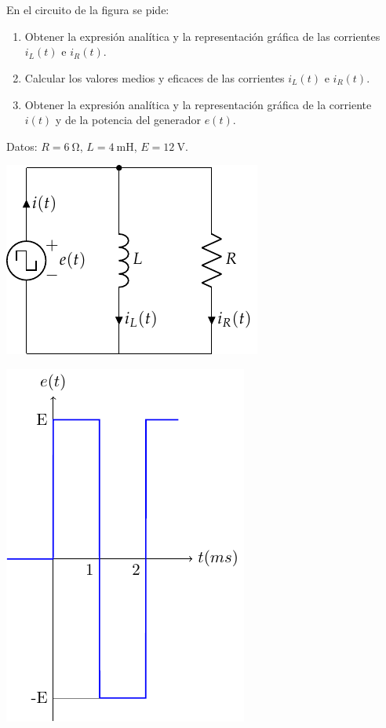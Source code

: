 \documentclass[10pt]{article}
\begin{document}
\clearpage

\section{}


En el circuito de la figura se pide:

\begin{enumerate}
\item Obtener la expresión analítica y la representación gráfica de las corrientes $i_L(t)$ e $i_R(t)$.
\item Calcular los valores medios y eficaces de las corrientes $i_L(t)$ e $i_R(t)$.
\item Obtener la expresión analítica y la representación gráfica de la corriente $i(t)$ y de la potencia del generador $e(t)$.
\end{enumerate}

Datos: $R = \SI{6}{\ohm}$, $L = \SI{4}{\milli\henry}$, $E = \SI{12}{\volt}$.

\begin{minipage}[c]{0.5\linewidth}
  \includegraphics{../figs/formas_onda2.pdf}
\end{minipage}
\begin{minipage}[c]{0.5\linewidth}
  \includegraphics{../figs/tren_pulsos2.pdf}
\end{minipage}
\end{document}
